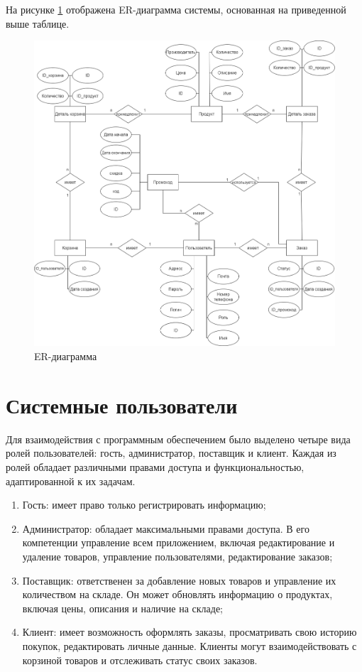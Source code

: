 На рисунке \ref{img:er-dia} отображена ER-диаграмма системы, основанная на приведенной выше таблице.
\begin{figure}[ht!]
	\centering
	\includegraphics[width=0.8\linewidth]{img/ER_dia.png}
	\caption{ER-диаграмма}
	\label{img:er-dia}
\end{figure}
\newpage
\section{Системные пользователи}

Для взаимодействия с программным обеспечением было выделено четыре вида ролей пользователей: гость, администратор, поставщик и клиент. Каждая из ролей обладает различными правами доступа и функциональностью, адаптированной к их задачам.

\begin{enumerate}
	\item Гость: имеет право только регистрировать информацию;
	\item Администратор: обладает максимальными правами доступа. В его компетенции управление всем приложением, включая редактирование и удаление товаров, управление пользователями, редактирование заказов;
	\item Поставщик: ответственен за добавление новых товаров и управление их количеством на складе. Он может обновлять информацию о продуктах, включая цены, описания и наличие на складе;
	\item Клиент: имеет возможность оформлять заказы, просматривать свою историю покупок, редактировать личные данные. Клиенты могут взаимодействовать с корзиной товаров и отслеживать статус своих заказов.
\end{enumerate}


